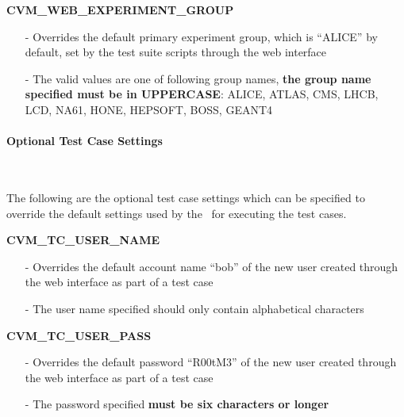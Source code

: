 \begin{description}
\item {\bf CVM\_WEB\_EXPERIMENT\_GROUP}
		\begin{itemize}
		\item[-]	Overrides the default \cernvm primary experiment group, which is ``ALICE''
				by default, set by the test suite scripts through the web interface
		\item[-]	The valid values are one of following group names, {\bf the group name
				specified must be in UPPERCASE}: ALICE, ATLAS, CMS, LHCB, LCD, NA61, HONE,
				HEPSOFT, BOSS, GEANT4	
		\end{itemize}
\end{description}


\paragraph*{Optional Test Case Settings}~\newline

The following are the optional test case settings which can be specified to override
the default settings used by the \cernvmtestframework\ for executing the \cernvmreleasetesting
test cases.

\begin{description}
\item {\bf CVM\_TC\_USER\_NAME}
		\begin{itemize}
		\item[-]	Overrides the default account name ``bob'' of the new user created 
				through the web interface as part of a \cernvmreleasetesting test case
		\item[-]	The user name specified should only contain alphabetical characters
		\end{itemize}
		
\item {\bf CVM\_TC\_USER\_PASS}
		\begin{itemize}
		\item[-]	Overrides the default password ``R00tM3'' of the new user created 
				through the web interface as part of a \cernvmreleasetesting test case
		\item[-]	The password specified {\bf must be six characters or longer}
		\end{itemize}
\end{description}